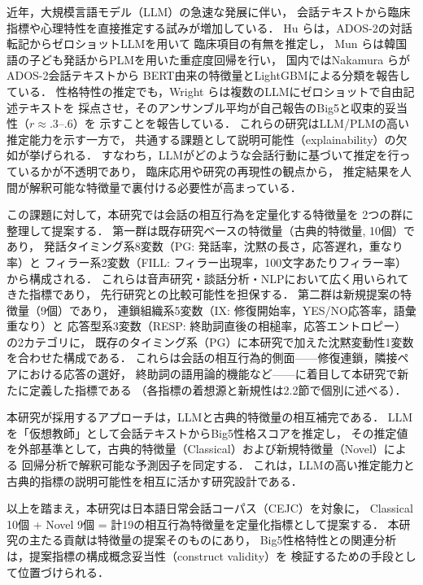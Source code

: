 \documentclass[dvipdfmx,11pt,a4paper]{bxjsarticle}
\renewcommand{\_}{\paperorigunderscore\allowbreak}%
\begin{document}
近年，大規模言語モデル（LLM）の急速な発展に伴い，
会話テキストから臨床指標や心理特性を直接推定する試みが増加している．
Hu ら\cite{hu2025}は，ADOS-2の対話転記からゼロショットLLMを用いて
臨床項目の有無を推定し，
Mun ら\cite{mun2024}は韓国語の子ども発話からPLMを用いた重症度回帰を行い，
国内ではNakamura ら\cite{nakamura2025}がADOS-2会話テキストから
BERT由来の特徴量とLightGBMによる分類を報告している．
性格特性の推定でも，Wright ら\cite{wright2026}は複数のLLMにゼロショットで自由記述テキストを
採点させ，そのアンサンブル平均が自己報告のBig5と収束的妥当性（$r \approx .3$--$.6$）を
示すことを報告している．
これらの研究はLLM/PLMの高い推定能力を示す一方で，
共通する課題として説明可能性（explainability）の欠如が挙げられる．
すなわち，LLMがどのような会話行動に基づいて推定を行っているかが不透明であり，
臨床応用や研究の再現性の観点から，
推定結果を人間が解釈可能な特徴量で裏付ける必要性が高まっている．

この課題に対して，本研究では会話の相互行為を定量化する特徴量を
2つの群に整理して提案する．
第一群は既存研究ベースの特徴量（古典的特徴量, 10個）であり，
発話タイミング系8変数（PG: 発話率，沈黙の長さ，応答遅れ，重なり率）と
フィラー系2変数（FILL: フィラー出現率，100文字あたりフィラー率）から構成される．
これらは音声研究・談話分析・NLPにおいて広く用いられてきた指標であり，
先行研究との比較可能性を担保する．
第二群は新規提案の特徴量（9個）であり，
連鎖組織系5変数（IX: 修復開始率，YES/NO応答率，語彙重なり）と
応答型系3変数（RESP: 終助詞直後の相槌率，応答エントロピー）の2カテゴリに，
既存のタイミング系（PG）に本研究で加えた沈黙変動性1変数を合わせた構成である．
これらは会話の相互行為的側面——修復連鎖，隣接ペアにおける応答の選好，
終助詞の語用論的機能など——に着目して本研究で新たに定義した指標である
（各指標の着想源と新規性は2.2節で個別に述べる）．

本研究が採用するアプローチは，LLMと古典的特徴量の相互補完である．
LLMを「仮想教師」として会話テキストからBig5性格スコアを推定し，
その推定値を外部基準として，古典的特徴量（Classical）および新規特徴量（Novel）による
回帰分析で解釈可能な予測因子を同定する．
これは，LLMの高い推定能力と古典的指標の説明可能性を相互に活かす研究設計である．

以上を踏まえ，本研究は日本語日常会話コーパス（CEJC）を対象に，
Classical 10個 + Novel 9個 = 計19の相互行為特徴量を定量化指標として提案する．
本研究の主たる貢献は特徴量の提案そのものにあり，
Big5性格特性との関連分析は，提案指標の構成概念妥当性（construct validity）を
検証するための手段として位置づけられる．
\end{document}
